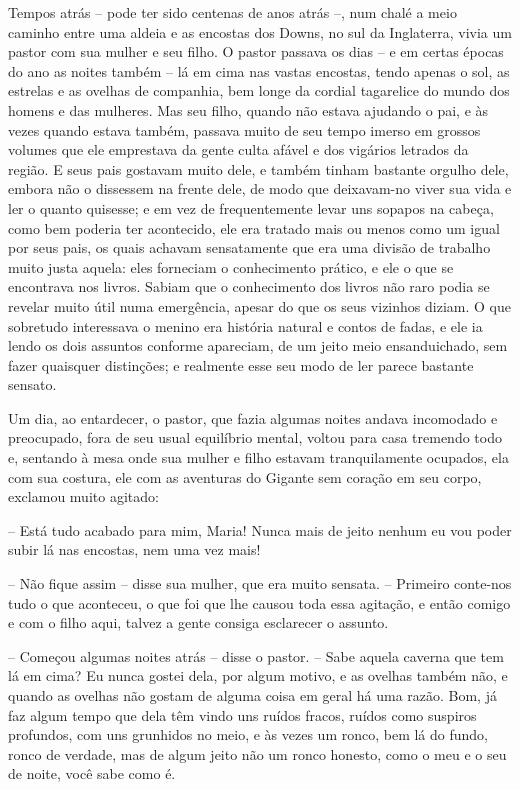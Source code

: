 Tempos atrás -- pode ter sido centenas de anos atrás --, num chalé a
meio caminho entre uma aldeia e as encostas dos Downs, no sul da
Inglaterra, vivia um pastor com sua mulher e seu filho. O pastor
passava os dias -- e em certas épocas do ano as noites também -- lá em
cima nas vastas encostas, tendo apenas o sol, as estrelas e as
ovelhas de companhia, bem longe da cordial tagarelice do mundo dos
homens e das mulheres. Mas seu filho, quando não estava ajudando o
pai, e às vezes quando estava também, passava muito de seu tempo
imerso em grossos volumes que ele emprestava da gente culta afável e
dos vigários letrados da região. E seus pais gostavam muito dele, e
também tinham bastante orgulho dele, embora não o dissessem na frente
dele, de modo que deixavam-no viver sua vida e ler o quanto quisesse;
e em vez de frequentemente levar uns sopapos na cabeça, como bem
poderia ter acontecido, ele era tratado mais ou menos como um igual
por seus pais, os quais achavam sensatamente que era uma divisão de
trabalho muito justa aquela: eles forneciam o conhecimento prático, e
ele o que se encontrava nos livros. Sabiam que o conhecimento dos
livros não raro podia se revelar muito útil numa emergência, apesar
do que os seus vizinhos diziam. O que sobretudo interessava o menino
era história natural e contos de fadas, e ele ia lendo os dois
assuntos conforme apareciam, de um jeito meio ensanduichado, sem
fazer quaisquer distinções; e realmente esse seu modo de ler parece
bastante sensato.

Um dia, ao entardecer, o pastor, que fazia algumas noites andava
incomodado e preocupado, fora de seu usual equilíbrio mental, voltou
para casa tremendo todo e, sentando à mesa onde sua mulher e filho
estavam tranquilamente ocupados, ela com sua costura, ele com as
aventuras do Gigante sem coração em seu corpo, exclamou muito
agitado:

-- Está tudo acabado para mim, Maria! Nunca mais de jeito nenhum eu vou
poder subir lá nas encostas, nem uma vez mais!

-- Não fique assim -- disse sua mulher, que era muito sensata. --
Primeiro conte-nos tudo o que aconteceu, o que foi que lhe causou
toda essa agitação, e então comigo e com o filho aqui, talvez a gente
consiga esclarecer o assunto.

-- Começou algumas noites atrás -- disse o pastor. -- Sabe aquela caverna
que tem lá em cima? Eu nunca gostei dela, por algum motivo, e as
ovelhas também não, e quando as ovelhas não gostam de alguma coisa em
geral há uma razão. Bom, já faz algum tempo que dela têm vindo uns
ruídos fracos, ruídos como suspiros profundos, com uns grunhidos no
meio, e às vezes um ronco, bem lá do fundo, ronco de verdade, mas de
algum jeito não um ronco honesto, como o meu e o seu de noite, você
sabe como é.

